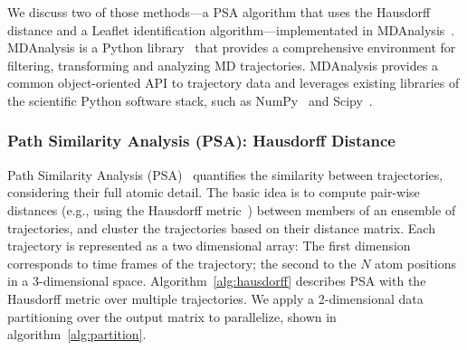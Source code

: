 We discuss two of those methods---a PSA algorithm that uses the Hausdorff
distance and a Leaflet identification algorithm---implementated in
MDAnalysis~\cite{michaud2011mdanalysis,gowers2016mdanalysis}.
MDAnalysis is a Python library~\cite{michaud2011mdanalysis,gowers2016mdanalysis}
that provides a comprehensive environment for filtering, transforming and
analyzing MD trajectories. MDAnalysis provides
a common object-oriented API to trajectory data and leverages existing libraries
of the scientific Python software stack, such as NumPy~\cite{numpy} and
Scipy~\cite{scipy}.

\subsubsection*{Path Similarity Analysis (PSA): Hausdorff Distance}

Path Similarity Analysis (PSA)~\cite{seyler2015path} quantifies the
similarity between trajectories, considering their full atomic detail. The
basic idea is to compute pair-wise distances (e.g., using the Hausdorff
metric~\cite{huttenlocher1993comparing}) between members of an ensemble of
trajectories, and cluster the trajectories based on their distance matrix. Each
trajectory is represented as a two dimensional array: The first dimension
corresponds to time frames of the trajectory; the second to the $N$ atom
positions in a 3-dimensional space. Algorithm~\ref{alg:hausdorff} describes 
PSA with the Hausdorff metric over multiple trajectories. We apply a 2-dimensional 
data partitioning over the output matrix to parallelize, shown in 
algorithm~\ref{alg:partition}.

